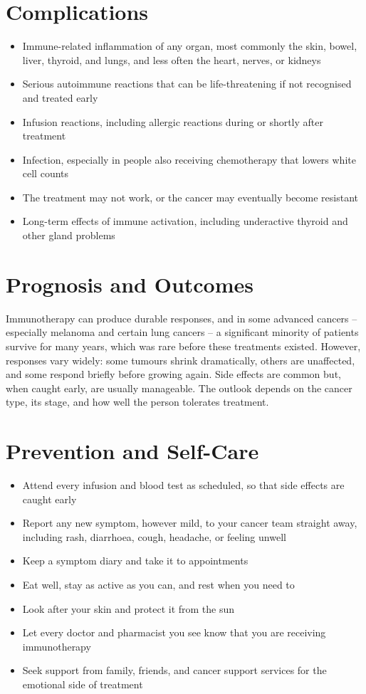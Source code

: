\section*{Complications}
\begin{itemize}
    \item Immune-related inflammation of any organ, most commonly the skin, bowel, liver, thyroid, and lungs, and less often the heart, nerves, or kidneys
    \item Serious autoimmune reactions that can be life-threatening if not recognised and treated early
    \item Infusion reactions, including allergic reactions during or shortly after treatment
    \item Infection, especially in people also receiving chemotherapy that lowers white cell counts
    \item The treatment may not work, or the cancer may eventually become resistant
    \item Long-term effects of immune activation, including underactive thyroid and other gland problems
\end{itemize}

\section*{Prognosis and Outcomes}
Immunotherapy can produce durable responses, and in some advanced cancers -- especially melanoma and certain lung cancers -- a significant minority of patients survive for many years, which was rare before these treatments existed. However, responses vary widely: some tumours shrink dramatically, others are unaffected, and some respond briefly before growing again. Side effects are common but, when caught early, are usually manageable. The outlook depends on the cancer type, its stage, and how well the person tolerates treatment.

\section*{Prevention and Self-Care}
\begin{itemize}
    \item Attend every infusion and blood test as scheduled, so that side effects are caught early
    \item Report any new symptom, however mild, to your cancer team straight away, including rash, diarrhoea, cough, headache, or feeling unwell
    \item Keep a symptom diary and take it to appointments
    \item Eat well, stay as active as you can, and rest when you need to
    \item Look after your skin and protect it from the sun
    \item Let every doctor and pharmacist you see know that you are receiving immunotherapy
    \item Seek support from family, friends, and cancer support services for the emotional side of treatment
\end{itemize}

